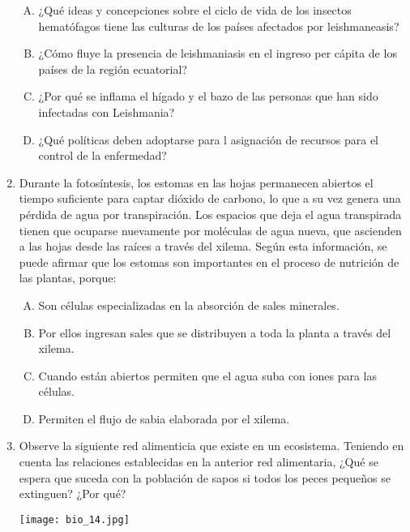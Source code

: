 \begin{enumerate}
\begin{enumerate}[(A)]
\item ¿Qué   ideas   y  concepciones  sobre el  ciclo de  vida de los  insectos hematófagos tiene las culturas   de los   países   afectados   por leishmaneasis?
\item ¿Cómo fluye  la presencia  de leishmaniasis   en el ingreso  per cápita  de los  países  de la región   ecuatorial?
\item ¿Por qué se inflama el hígado  y el bazo   de las personas  que han  sido infectadas con Leishmania?
\item ¿Qué políticas  deben    adoptarse    para l  asignación   de  recursos   para el control  de la enfermedad?
\end{enumerate}


\item Durante la fotosíntesis, los estomas en las hojas permanecen abiertos  el tiempo suficiente para captar dióxido de carbono, lo que a su vez genera  una pérdida de agua por transpiración.  Los espacios que deja el agua transpirada tienen que ocuparse nuevamente  por moléculas de agua nueva, que ascienden a las hojas desde las raíces a través del xilema. Según esta información, se puede afirmar que los estomas son importantes en el proceso de nutrición de las plantas, porque: \label{bio-24}

\begin{enumerate}[(A)]
\item Son células especializadas en la absorción de sales minerales.
\item Por ellos ingresan sales que se distribuyen a toda la planta a través del xilema.
\item Cuando están abiertos permiten que el agua suba con iones para las células.
\item Permiten el flujo de sabia elaborada por el xilema.  
\end{enumerate}



\item Observe la siguiente red alimenticia que existe en un ecosistema. Teniendo en cuenta las relaciones establecidas en la anterior red alimentaria, ¿Qué se espera que suceda con la población de sapos si todos los peces pequeños se extinguen? ¿Por qué? \label{bio-25}
\begin{flushleft}
\texttt{[image: bio\_14.jpg]} 
\end{flushleft}


\end{enumerate}
